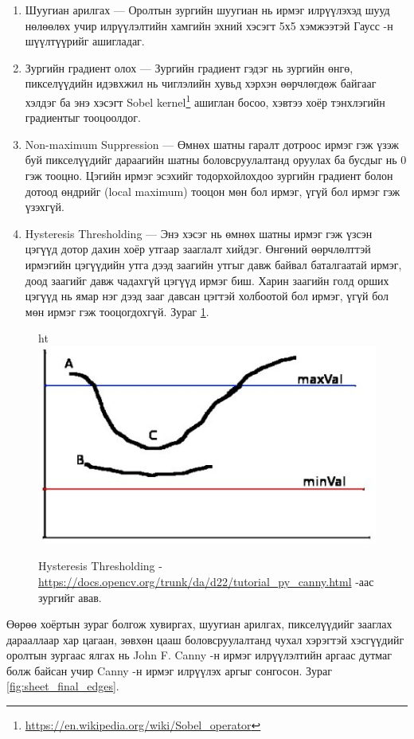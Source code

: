 \begin{enumerate}
	\item Шуугиан арилгах --- Оролтын зургийн шуугиан нь ирмэг илрүүлэхэд шууд нөлөөлөх учир илрүүлэлтийн хамгийн эхний хэсэгт 5х5 хэмжээтэй Гаусс -н шүүлтүүрийг ашигладаг.
	\item Зургийн градиент олох --- Зургийн градиент гэдэг нь зургийн өнгө, пикселүүдийн идэвхжил нь чиглэлийн хувьд хэрхэн өөрчлөгдөж байгааг хэлдэг ба энэ хэсэгт Sobel kernel\footnote{\url{https://en.wikipedia.org/wiki/Sobel_operator}} ашиглан босоо, хэвтээ хоёр тэнхлэгийн градиентыг тооцоолдог.
	\item Non-maximum Suppression --- Өмнөх шатны гаралт дотроос ирмэг гэж үзэж буй пикселүүдийг дараагийн шатны боловсруулалтанд оруулах ба бусдыг нь 0 гэж тооцно. Цэгийн ирмэг эсэхийг тодорхойлохдоо зургийн градиент болон дотоод өндрийг (local maximum) тооцон мөн бол ирмэг, үгүй бол ирмэг гэж үзэхгүй.
	\item Hysteresis Thresholding --- Энэ хэсэг нь өмнөх шатны ирмэг гэж үзсэн цэгүүд дотор дахин хоёр утгаар зааглалт хийдэг. Өнгөний өөрчлөлттэй ирмэгийн цэгүүдийн утга дээд заагийн утгыг давж байвал баталгаатай ирмэг, доод заагийг давж чадахгүй цэгүүд ирмэг биш. Харин заагийн голд орших цэгүүд нь ямар нэг дээд зааг давсан цэгтэй холбоотой бол ирмэг, үгүй бол мөн ирмэг гэж тооцогдохгүй. Зураг \ref{fig:hysteresis}.
\end{enumerate}

\begin{figure}{ht}
	\centering
	\includegraphics[width=0.6\linewidth]{images/hysteresis}
	\caption{Hysteresis Thresholding - \url{https://docs.opencv.org/trunk/da/d22/tutorial_py_canny.html} -аас зургийг авав.}
	\label{fig:hysteresis}
\end{figure}

Өөрөө хоёртын зураг болгож хувиргах, шуугиан арилгах, пикселүүдийг зааглах дарааллаар хар цагаан, зөвхөн цааш боловсруулалтанд чухал хэрэгтэй хэсгүүдийг оролтын зургаас ялгах нь John F. Canny -н ирмэг илрүүлэлтийн аргаас дутмаг болж байсан учир Canny -н ирмэг илрүүлэх аргыг сонгосон. Зураг \ref{fig:sheet_final_edges}.


